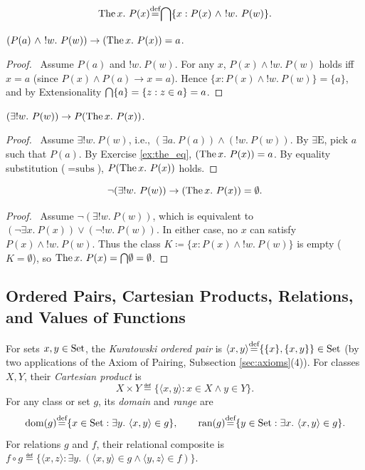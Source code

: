 \documentclass[10pt,a4paper]{article}
\renewcommand{\myprf}{\begin{proof}}
\renewcommand{\myqed}{\end{proof}}
\begin{document}
\begin{definition}
$$\The x.\ P(x) \eqdef \inter \{x : P(x)\ \land\ !w.\ P(w)\}.$$
\end{definition}

\begin{exercise}\label{ex:the_eq}
$(P(a)\ \land\ !w.\ P(w)) \to (\The x.\ P(x))=a$.
\end{exercise}
\myprf\ Assume $P(a)$ and $!w.\ P(w)$. For any $x$, $P(x) \land !w.\ P(w)$ holds iff $x = a$ (since $P(x) \land P(a) \to x=a$). Hence $\{x : P(x) \land !w.\ P(w)\} = \{a\}$, and by Extensionality ${\bigcap} \{a\} = \{z : z \in a\} = a$. \myqed

\begin{exercise}\label{ex:the_prop}
$(\exists !w.\ P(w)) \to P(\The x.\ P(x))$.
\end{exercise}
\myprf\ Assume $\exists !w.\ P(w)$, i.e., $(\exists a.\ P(a)) \land (!w.\ P(w))$. By $\exists\textrm{E}$, pick $a$ such that $P(a)$. By Exercise \ref{ex:the_eq}, $({\textrm{The\,}} x.\ P(x)) = a$. By equality substitution ($=\textrm{subs}$), $P({\textrm{The\,}} x.\ P(x))$ holds. \myqed

\begin{lemma}\label{lem:the_default}
$$\neg (\exists !w.\ P(w)) \to ({\textrm{The\,}} x.\ P(x)) = \emptyset.$$
\end{lemma}
\myprf\ Assume $\neg (\exists !w.\ P(w))$, which is equivalent to $(\neg \exists x.\ P(x)) \lor (\neg !w.\ P(w))$. In either case, no $x$ can satisfy $P(x) \land !w.\ P(w)$. Thus the class $K \coloneqq \{x : P(x) \land !w.\ P(w)\}$ is empty ($K = \emptyset$), so ${\textrm{The\,}} x.\ P(x) = {\bigcap} \emptyset = \emptyset$. \myqed

\subsection{Ordered Pairs, Cartesian Products, Relations, and Values of Functions}\label{sec:pairs_rels}
\begin{definition}\label{def:pair_rel}
For sets $x, y \in {\textrm{Set}}$, the \emph{Kuratowski ordered pair} is $\langle x, y \rangle {\stackrel{{\textrm{def}}}{=}} \{\{x\}, \{x, y\}\} \in {\textrm{Set}}$ (by two applications of the Axiom of Pairing, Subsection \ref{sec:axioms}(4)). For classes $X, Y$, their \emph{Cartesian product} is
$$X \times Y \eqdef \{\langle x, y \rangle : x \in X \land y \in Y\}.$$
For any class or set $g$, its \emph{domain} and \emph{range} are
$$\dom(g) \eqdef \{x \in \Set : \exists y.\ \langle x, y \rangle \in g\}, \qquad \ran(g) \eqdef \{y \in \Set : \exists x.\ \langle x, y \rangle \in g\}.$$
For relations $g$ and $f$, their relational composite is $f \circ g \eqdef \{\langle x, z \rangle : \exists y.\ (\langle x, y \rangle \in g \land \langle y, z \rangle \in f)\}$.
\end{definition}
\end{document}
